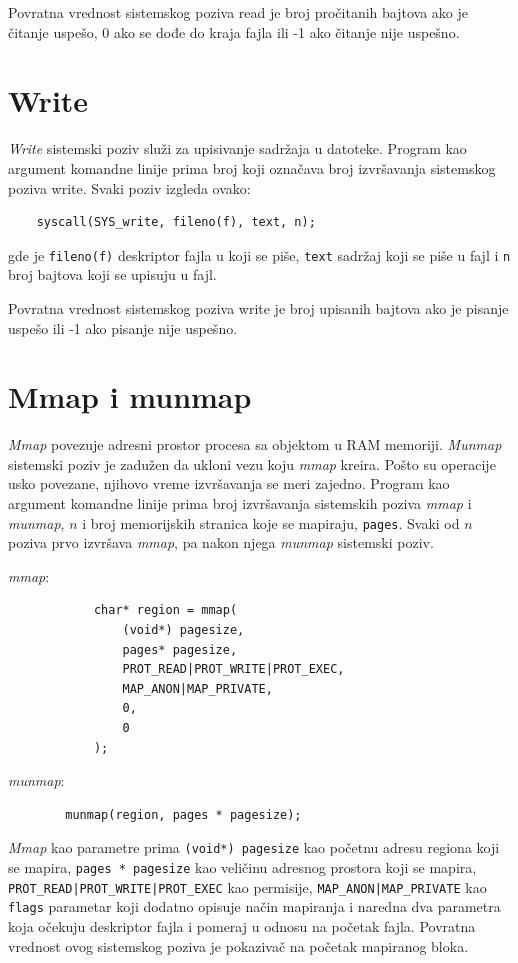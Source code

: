 \documentclass[12pt]{report}
\begin{document}
Povratna vrednost sistemskog poziva read je broj pročitanih bajtova ako je čitanje uspešo, 0 ako se dođe do kraja fajla ili -1 ako čitanje nije uspešno.

\section{Write}
\textit{Write} sistemski poziv služi za upisivanje sadržaja u datoteke. Program kao argument komandne linije prima broj koji označava broj izvršavanja sistemskog poziva write. Svaki poziv izgleda ovako:
\begin{verbatim}
    syscall(SYS_write, fileno(f), text, n);
\end{verbatim}
gde je \texttt{fileno(f)} deskriptor fajla u koji se piše, \texttt{text} sadržaj koji se piše u fajl i \texttt{n} broj bajtova koji se upisuju u fajl.

Povratna vrednost sistemskog poziva write je broj upisanih bajtova ako je pisanje uspešo ili -1 ako pisanje nije uspešno.

\section{Mmap i munmap}
\textit{Mmap} povezuje adresni prostor procesa sa objektom u RAM memoriji. \textit{Munmap} sistemski poziv je zadužen da ukloni vezu koju \textit{mmap} kreira. Pošto su operacije usko povezane, njihovo vreme izvršavanja se meri zajedno. Program kao argument komandne linije prima broj izvršavanja sistemskih poziva \textit{mmap} i \textit{munmap}, $ n $ i broj memorijskih stranica koje se mapiraju, \texttt{pages}. Svaki od $ n $ poziva prvo izvršava \textit{mmap}, pa nakon njega \textit{munmap} sistemski poziv.

\begin{samepage}
    \textit{mmap}:
    \begin{verbatim}
            char* region = mmap(
                (void*) pagesize,
                pages* pagesize,
                PROT_READ|PROT_WRITE|PROT_EXEC,
                MAP_ANON|MAP_PRIVATE,
                0,
                0
            );
    \end{verbatim}
\end{samepage}

\textit{munmap}:
\begin{verbatim}
        munmap(region, pages * pagesize);
\end{verbatim}

\textit{Mmap} kao parametre prima \texttt{(void*) pagesize} kao početnu adresu regiona koji se mapira, \texttt{pages * pagesize} kao veličinu adresnog prostora koji se mapira, \texttt{PROT\_READ|PROT\_WRITE|PROT\_EXEC} kao permisije, \texttt{MAP\_ANON|MAP\_PRIVATE} kao \texttt{flags} parametar koji dodatno opisuje način mapiranja i naredna dva parametra koja očekuju deskriptor fajla i pomeraj u odnosu na početak fajla. Povratna vrednost ovog sistemskog poziva je pokazivač na početak mapiranog bloka.
\end{document}
